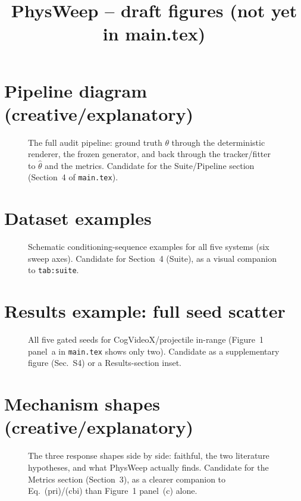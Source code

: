 \documentclass[10pt,letterpaper]{article}
\title{PhysWeep -- draft figures (not yet in main.tex)}
\author{}
\date{}
\begin{document}
\maketitle
\tableofcontents

\clearpage
\section{Pipeline diagram (creative/explanatory)}
\begin{figure}[h]\centering
\resizebox{\textwidth}{!}{}
\caption{The full audit pipeline: ground truth $\theta$ through the
deterministic renderer, the frozen generator, and back through the
tracker/fitter to $\hat\theta$ and the metrics. Candidate for the
Suite/Pipeline section (Section~4 of \texttt{main.tex}).}
\end{figure}

\clearpage
\section{Dataset examples}
\begin{figure}[h]\centering
\resizebox{0.85\textwidth}{!}{}
\caption{Schematic conditioning-sequence examples for all five systems
(six sweep axes). Candidate for Section~4 (Suite), as a visual companion
to \texttt{tab:suite}.}
\end{figure}

\clearpage
\section{Results example: full seed scatter}
\begin{figure}[h]\centering
\resizebox{0.85\textwidth}{!}{}
\caption{All five gated seeds for CogVideoX/projectile in-range (Figure~1
panel~a in \texttt{main.tex} shows only two). Candidate as a supplementary
figure (Sec.~S4) or a Results-section inset.}
\end{figure}

\clearpage
\section{Mechanism shapes (creative/explanatory)}
\begin{figure}[h]\centering
\resizebox{\textwidth}{!}{}
\caption{The three response shapes side by side: faithful, the two
literature hypotheses, and what PhysWeep actually finds. Candidate for the
Metrics section (Section~3), as a clearer companion to Eq.~(pri)/(cbi)
than Figure~1 panel~(c) alone.}
\end{figure}
\end{document}
